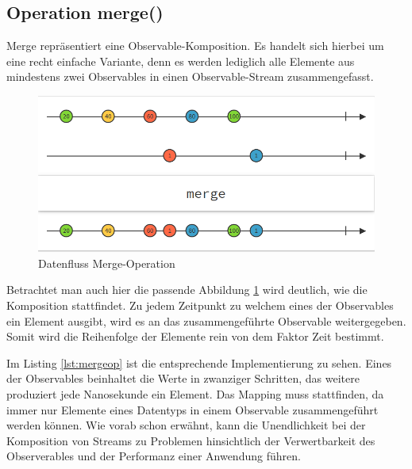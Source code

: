 \subsection{Operation merge()}
Merge repräsentiert eine Observable-Komposition. Es handelt sich hierbei um eine recht einfache Variante, denn es werden lediglich alle Elemente aus mindestens zwei Observables in einen Observable-Stream zusammengefasst. 
\begin{figure}[hbt]
	\centering
	\includegraphics[width=1\textwidth]{Abb/merge}
	\caption{Datenfluss Merge-Operation}
	\label{pic:merge}
\end{figure}
Betrachtet man auch hier die passende Abbildung \ref{pic:merge} wird deutlich, wie die Komposition stattfindet. Zu jedem Zeitpunkt zu welchem eines der Observables ein Element ausgibt, wird es an das zusammengeführte Observable weitergegeben. Somit wird die Reihenfolge der Elemente rein von dem Faktor Zeit bestimmt.
 
Im Listing \ref{lst:mergeop} ist die entsprechende Implementierung zu sehen. Eines der Observables beinhaltet die Werte in zwanziger Schritten, das weitere produziert jede Nanosekunde ein Element. Das Mapping muss stattfinden, da immer nur Elemente eines Datentyps in einem Observable zusammengeführt werden können. Wie vorab schon erwähnt, kann die Unendlichkeit bei der Komposition von Streams zu Problemen hinsichtlich der Verwertbarkeit des Observerables und der Performanz einer Anwendung führen.
